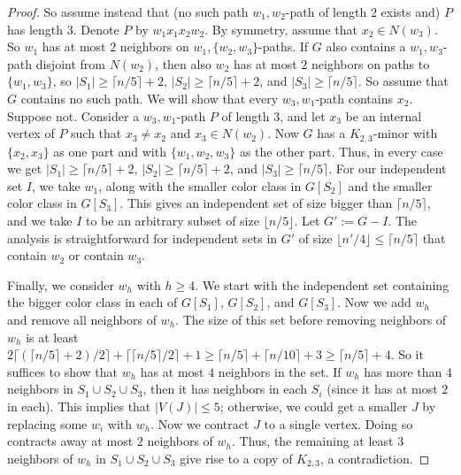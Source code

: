 \documentclass[11pt]{article}
\theoremstyle{definition}
\newcommand\floor[1]{\lfloor#1\rfloor}
\newcommand\ceil[1]{\lceil#1\rceil}
\renewcommand\ge\geqslant
\renewcommand\le\leqslant
\begin{document}
\begin{proof}
So assume instead that (no such path $w_1,w_2$-path of length $2$ exists and) $P$ has length $3$.
Denote $P$ by $w_1x_1x_2w_2$.  By symmetry, assume that $x_2\in N(w_3)$.  So $w_1$ has at most $2$ neighbors on $w_1,\{w_2,w_3\}$-paths.
If $G$ also contains a $w_1,w_3$-path disjoint from $N(w_2)$, then also $w_2$ has at most $2$ neighbors on paths to $\{w_1,w_3\}$,
so $|S_1|\ge \ceil{n/5}+2$, $|S_2|\ge \ceil{n/5}+2$, and $|S_3|\ge \ceil{n/5}$.  So assume that $G$ contains no such path.
We will show that every $w_3,w_1$-path contains $x_2$.  Suppose not.  Consider a $w_3,w_1$-path $P$ of length $3$, and let $x_3$
be an internal vertex of $P$ such that $x_3\ne x_2$ and $x_3\in N(w_2)$.  Now $G$ has a $K_{2,3}$-minor with $\{x_2,x_3\}$ as one part and 
with $\{w_1,w_2,w_3\}$ as the other part.  Thus, in every case we get $|S_1|\ge \ceil{n/5}+2$, $|S_2|\ge \ceil{n/5}+2$, and $|S_3|\ge \ceil{n/5}$.
For our independent set $I$, we take $w_1$, along with the smaller color class in $G[S_2]$ and the smaller color class in $G[S_3]$.
This gives an independent set of size bigger than $\ceil{n/5}$, and we take $I$ to be an arbitrary subset of size $\floor{n/5}$.  
Let $G':=G-I$.  The analysis is straightforward for independent sets in $G'$ of size $\floor{n'/4}\le \ceil{n/5}$
that contain $w_2$ or contain $w_3$.

Finally, we consider $w_h$ with $h\ge 4$.  We start with the independent set containing the bigger color class in each of $G[S_1]$, $G[S_2]$, and $G[S_3]$.
Now we add $w_h$ and remove all neighbors of $w_h$.  The size of this set before removing neighbors of $w_h$ is at least
$2\ceil{(\ceil{n/5}+2)/2}+\ceil{\ceil{n/5}/2}+1\ge \ceil{n/5}+\ceil{n/10}+3\ge \ceil{n/5}+4$.  So it suffices to show that $w_h$ has at most $4$ neighbors
in the set.  If $w_h$ has more than $4$ neighbors in $S_1\cup S_2\cup S_3$, then it has neighbors in each $S_i$ (since it has at most $2$ in each).
This implies that $|V(J)|\le5$; otherwise, we could get a smaller $J$ by replacing some $w_i$ with $w_h$.  Now we contract $J$ to a single vertex.
Doing so contracts away at most $2$ neighbors of $w_h$.  Thus, the remaining at least $3$ neighbors of $w_h$ in $S_1\cup S_2\cup S_3$ give rise to a 
copy of $K_{2,3}$, a contradiction.
\end{proof}
\end{document}
